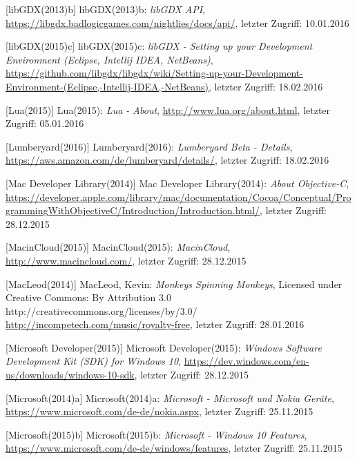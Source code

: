 \begin{thebibliography}{}
[libGDX(2013)b] libGDX(2013)b: \emph{libGDX API},
\url{https://libgdx.badlogicgames.com/nightlies/docs/api/}, letzter Zugriff: 10.01.2016

[libGDX(2015)c] libGDX(2015)c: \emph{libGDX - Setting up your Development Environment (Eclipse, Intellij IDEA, NetBeans)},
\url{https://github.com/libgdx/libgdx/wiki/Setting-up-your-Development-Environment-(Eclipse,-Intellij-IDEA,-NetBeans)}, letzter Zugriff: 18.02.2016

[Lua(2015)] Lua(2015): \emph{Lua - About},
\url{http://www.lua.org/about.html}, letzter Zugriff: 05.01.2016

[Lumberyard(2016)] Lumberyard(2016): \emph{Lumberyard Beta - Details},
\url{https://aws.amazon.com/de/lumberyard/details/}, letzter Zugriff: 18.02.2016

[Mac Developer Library(2014)] Mac Developer Library(2014): \emph{About Objective-C},
\url{https://developer.apple.com/library/mac/documentation/Cocoa/Conceptual/ProgrammingWithObjectiveC/Introduction/Introduction.html/}, letzter Zugriff: 28.12.2015

[MacinCloud(2015)] MacinCloud(2015): \emph{MacinCloud},
\url{http://www.macincloud.com/}, letzter Zugriff: 28.12.2015

[MacLeod(2014)] MacLeod, Kevin:
\emph{Monkeys Spinning Monkeys},
Licensed under Creative Commons: By Attribution 3.0
http://creativecommons.org/licenses/by/3.0/
\url{http://incompetech.com/music/royalty-free}, letzter Zugriff: 28.01.2016

[Microsoft Developer(2015)] Microsoft Developer(2015): \emph{Windows Software Development Kit (SDK) for Windows 10},
\url{https://dev.windows.com/en-us/downloads/windows-10-sdk}, letzter Zugriff: 28.12.2015

[Microsoft(2014)a] Microsoft(2014)a: \emph{Microsoft - Microsoft und Nokia Geräte},
\url{https://www.microsoft.com/de-de/nokia.aspx}, letzter Zugriff: 25.11.2015

[Microsoft(2015)b] Microsoft(2015)b: \emph{Microsoft - Windows 10 Features},
\url{https://www.microsoft.com/de-de/windows/features}, letzter Zugriff: 25.11.2015


\end{thebibliography}
